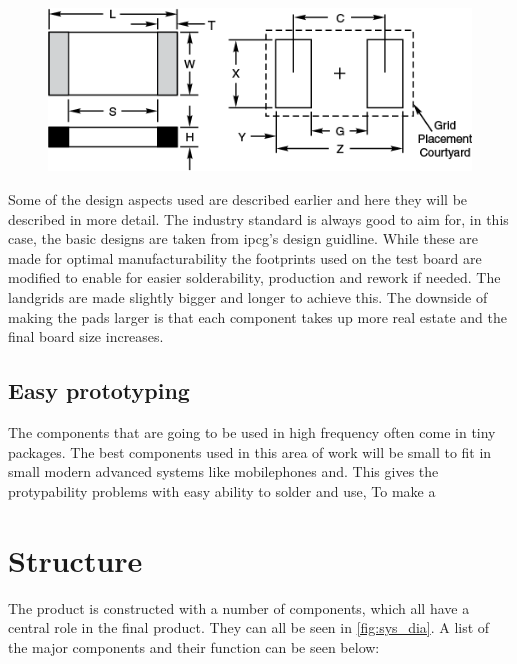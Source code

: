 \begin{figure}[H] 
	\centering 
	\includegraphics[width=.8\linewidth]{Figures/0402_landgrid} 
	\label{fig:sys_dia} 
\end{figure} 

Some of the design aspects used are described earlier and here they will be described in more detail.  
The industry standard is always good to aim for, in this case, the basic designs are taken from \gls{ipcg}'s design guidline\cite{ipcg}. While these are made for optimal manufacturability the footprints used on the test board are modified to enable for easier solderability, production and rework if needed. The landgrids are made slightly bigger and longer to achieve this. The downside of making the pads larger is that each component takes up more real estate and the final board size increases.

\subsection{Easy prototyping}
The components that are going to be used in high frequency often come in tiny packages. The best components used in this area of work will be small to fit in small modern advanced systems like mobilephones and.  This gives the protypability problems with easy ability to solder and use, To make a

\section{Structure}
The product is constructed with a number of components, which all have a central role in the final product. They can all be seen in \autoref{fig:sys_dia}. A list of the major components and their function can be seen below:

